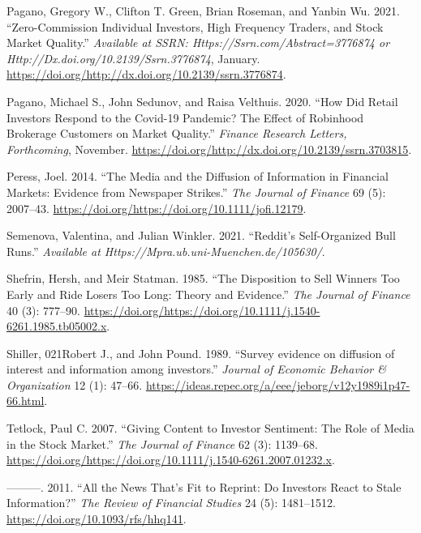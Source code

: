 \documentclass[12pt,]{article}
\begin{document}
\leavevmode\hypertarget{ref-eaton2021}{}%
Pagano, Gregory W., Clifton T. Green, Brian Roseman, and Yanbin Wu.
2021. ``Zero-Commission Individual Investors, High Frequency Traders,
and Stock Market Quality.'' \emph{Available at SSRN:
Https://Ssrn.com/Abstract=3776874 or
Http://Dx.doi.org/10.2139/Ssrn.3776874}, January.
\url{https://doi.org/http://dx.doi.org/10.2139/ssrn.3776874}.

\leavevmode\hypertarget{ref-pagano2020}{}%
Pagano, Michael S., John Sedunov, and Raisa Velthuis. 2020. ``How Did
Retail Investors Respond to the Covid-19 Pandemic? The Effect of
Robinhood Brokerage Customers on Market Quality.'' \emph{Finance
Research Letters, Forthcoming}, November.
\href{https://doi.org/http://dx.doi.org/10.2139/ssrn.3703815\%20}{https://doi.org/http://dx.doi.org/10.2139/ssrn.3703815}.

\leavevmode\hypertarget{ref-peress2014}{}%
Peress, Joel. 2014. ``The Media and the Diffusion of Information in
Financial Markets: Evidence from Newspaper Strikes.'' \emph{The Journal
of Finance} 69 (5): 2007--43.
\url{https://doi.org/https://doi.org/10.1111/jofi.12179}.

\leavevmode\hypertarget{ref-semenova2021}{}%
Semenova, Valentina, and Julian Winkler. 2021. ``Reddit's Self-Organized
Bull Runs.'' \emph{Available at
Https://Mpra.ub.uni-Muenchen.de/105630/}.

\leavevmode\hypertarget{ref-shefrin1985}{}%
Shefrin, Hersh, and Meir Statman. 1985. ``The Disposition to Sell
Winners Too Early and Ride Losers Too Long: Theory and Evidence.''
\emph{The Journal of Finance} 40 (3): 777--90.
\url{https://doi.org/https://doi.org/10.1111/j.1540-6261.1985.tb05002.x}.

\leavevmode\hypertarget{ref-shiller1989}{}%
Shiller, 021Robert J., and John Pound. 1989. ``Survey evidence on
diffusion of interest and information among investors.'' \emph{Journal
of Economic Behavior \& Organization} 12 (1): 47--66.
\url{https://ideas.repec.org/a/eee/jeborg/v12y1989i1p47-66.html}.

\leavevmode\hypertarget{ref-tetlock2007}{}%
Tetlock, Paul C. 2007. ``Giving Content to Investor Sentiment: The Role
of Media in the Stock Market.'' \emph{The Journal of Finance} 62 (3):
1139--68.
\url{https://doi.org/https://doi.org/10.1111/j.1540-6261.2007.01232.x}.

\leavevmode\hypertarget{ref-tetlock2011}{}%
---------. 2011. ``All the News That's Fit to Reprint: Do Investors
React to Stale Information?'' \emph{The Review of Financial Studies} 24
(5): 1481--1512. \url{https://doi.org/10.1093/rfs/hhq141}.
\end{document}
